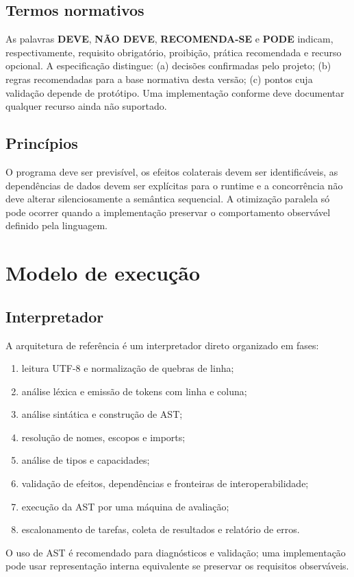 \documentclass[12pt,a4paper]{article}
\begin{document}
\subsection{Termos normativos}
As palavras \textbf{DEVE}, \textbf{NÃO DEVE}, \textbf{RECOMENDA-SE} e \textbf{PODE} indicam, respectivamente, requisito obrigatório, proibição, prática recomendada e recurso opcional. A especificação distingue: (a) decisões confirmadas pelo projeto; (b) regras recomendadas para a base normativa desta versão; (c) pontos cuja validação depende de protótipo. Uma implementação conforme deve documentar qualquer recurso ainda não suportado.
\subsection{Princípios}
O programa deve ser previsível, os efeitos colaterais devem ser identificáveis, as dependências de dados devem ser explícitas para o runtime e a concorrência não deve alterar silenciosamente a semântica sequencial. A otimização paralela só pode ocorrer quando a implementação preservar o comportamento observável definido pela linguagem.
\section{Modelo de execução}
\subsection{Interpretador}
A arquitetura de referência é um interpretador direto organizado em fases:
\begin{enumerate}
\item leitura UTF-8 e normalização de quebras de linha;
\item análise léxica e emissão de tokens com linha e coluna;
\item análise sintática e construção de AST;
\item resolução de nomes, escopos e imports;
\item análise de tipos e capacidades;
\item validação de efeitos, dependências e fronteiras de interoperabilidade;
\item execução da AST por uma máquina de avaliação;
\item escalonamento de tarefas, coleta de resultados e relatório de erros.
\end{enumerate}
O uso de AST é recomendado para diagnósticos e validação; uma implementação pode usar representação interna equivalente se preservar os requisitos observáveis.
\end{document}
